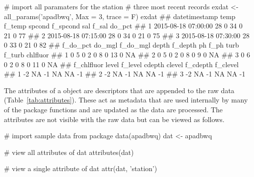 \begin{example}
# import all paramaters for the station
# three most recent records
exdat <- all_params('apadbwq', Max = 3, trace = F)
exdat
##         datetimestamp temp f_temp spcond f_spcond sal f_sal do_pct
## 1 2015-08-18 07:00:00   28      0     34        0  21     0     77
## 2 2015-08-18 07:15:00   28      0     34        0  21     0     75
## 3 2015-08-18 07:30:00   28      0     33        0  21     0     82
##   f_do_pct do_mgl f_do_mgl depth f_depth ph f_ph turb f_turb chlfluor
## 1        0      5        0     2       0  8    0   13      0       NA
## 2        0      5        0     2       0  8    0    9      0       NA
## 3        0      6        0     2       0  8    0   11      0       NA
##   f_chlfluor level f_level cdepth clevel f_cdepth f_clevel
## 1         -2    NA      -1     NA     NA       -1         
## 2         -2    NA      -1     NA     NA       -1         
## 3         -2    NA      -1     NA     NA       -1
\end{example}

The attributes of a  object are descriptors that are appended to the raw data (Table~\ref{tab:attributes}).  These act as metadata that are used internally by many of the package functions and are updated as the data are processed. The attributes are not visible with the raw data but can be viewed as follows.

\begin{example}
# import sample data from package
data(apadbwq)
dat <- apadbwq

# view all attributes of dat
attributes(dat)
 
# view a single attribute of dat
attr(dat, 'station')
\end{example}
 
